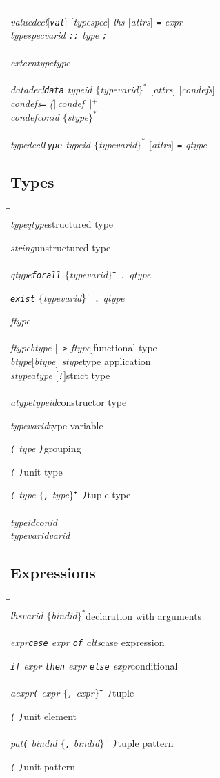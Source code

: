 \documentclass[a4paper,dvips]{article}
\newcommand{\ttbar}{\char124}
\newenvironment{productions}%
  {\begin{tabbing}\hspace{2cm}\=\hspace{6cm}\=\kill{}\\}%
  {\end{tabbing}}
\newcommand{\fixed}[1]{\makebox[3.5em]{#1}}
\newcommand{\production}[3]{\nont{#1}\>\fixed{$\rightarrow$}\nont{#2}\>#3\\}
\newcommand{\next}[2]{\strut{}\>\fixed{$|$}\nont{#1}\>#2\\}
\newcommand{\nont}[1]{\textit{#1}}
\newcommand{\pspace}{\hspace{0.25ex}}
\newcommand{\opt}[1]{$[$#1$]$}
\newcommand{\many}[1]{$\{$#1\pspace$\}^*$}
\newcommand{\manyone}[1]{$\{$#1\pspace$\}^\textrm{\tt+}$}
\newcommand{\bananas}[2]{{\rm (}\hspace{-0.5ex}$|\,$#1\pspace$\,|$\hspace{-0.5ex}{\rm )}$^{#2}$}
\newcommand{\sepbyone}[2]{\bananas{#1 #2}{+}}
\newcommand{\sepbytwo}[2]{#1 \manyone{#2 #1}}
\newcommand{\term}[1]{{\tt #1}}
\newcommand{\por}{$|$}
\begin{document}
\begin{productions}
\production{valuedecl}{\opt{\term{val}} \opt{typespec} lhs \opt{attrs} \term{=} expr}{}
\production{typespec}{varid \term{::} type \term{;}}{}
\\
\production{externtype}{type}{}
\\
\production{datadecl}{\term{data} typeid \many{typevarid} \opt{attrs} \opt{condefs}}{}
\production{condefs}{\term{=} \sepbyone{condef}{\term{\ttbar}} }{}
\production{condef}{conid \many{stype}}{}
\\
\production{typedecl}{\term{type} typeid \many{typevarid} \opt{attrs} \term{=} qtype}{}
\end{productions}

\subsection{Types}

\begin{productions}
\production{type}{qtype}{structured type}
\next{string}{unstructured type}
\\
\production{qtype}{\term{forall} \manyone{typevarid} \term{.} qtype}{}
\next{\term{exist} \manyone{typevarid} \term{.} qtype}{}
\next{ftype}{}
\\
\production{ftype}{btype \opt{\term{->} ftype}}{functional type}
\production{btype}{\opt{btype} stype}{type application}
\production{stype}{atype \opt{\term{!}}}{strict type}
\\
\production{atype}{typeid}{constructor type}
\next{typevarid}{type variable}
\next{\term{(} type \term{)}}{grouping}
\next{\term{(} \term{)}}{unit type}
\next{\term{(} \sepbytwo{type}{\term{,}} \term{)}}{tuple type}
\\
\production{typeid}{conid}{}
\production{typevarid}{varid}{}
\end{productions}


\subsection{Expressions}

\begin{productions}
\production{lhs}{varid \many{bindid}}{declaration with arguments}
\\
\production{expr}{\term{case} expr \term{of} alts}{case expression}
\next{\term{if} expr \term{then} expr \term{else} expr}{conditional}
\\
\production{aexpr}{\term{(} expr \manyone{\term{,} expr} \term{)}}{tuple}
\next{\term{(} \term{)}}{unit element}
\\
\production{pat}{\term{(} \sepbytwo{bindid}{\term{,}} \term{)}}{tuple pattern}
\next{\term{(} \term{)}}{unit pattern}
\end{productions}
\end{document}
